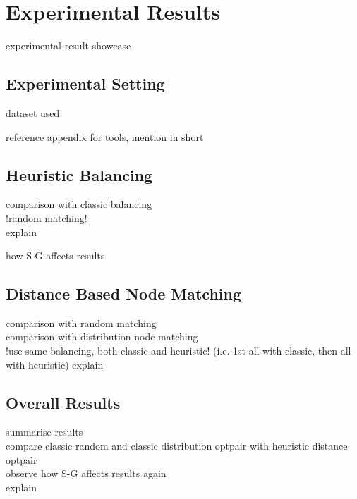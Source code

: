 \chapter{Experimental Results} \label{chap:expRes}

experimental result showcase

\section{Experimental Setting} \label{sec:expRes-setting}

dataset used

reference appendix for tools, mention in short

\section{Heuristic Balancing} \label{sec:expRes-heuristic}

comparison with classic balancing\\
!random matching!\\
explain

how S-G affects results

\section{Distance Based Node Matching} \label{sec:expRes-distNodeMatch}

comparison with random matching\\
comparison with distribution node matching\\
!use same balancing, both classic and heuristic! (i.e. 1st all with classic, then all with heuristic)
explain

\section{Overall Results} \label{sec:expRes-overall}

summarise results\\
compare classic random and classic distribution optpair with heuristic distance optpair\\
observe how S-G affects results again\\

explain